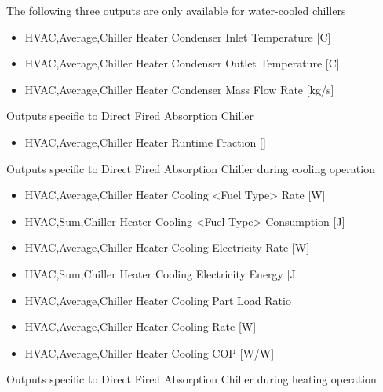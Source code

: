 The following three outputs are only available for water-cooled chillers

\begin{itemize}
\item
  HVAC,Average,Chiller Heater Condenser Inlet Temperature {[}C{]}
\item
  HVAC,Average,Chiller Heater Condenser Outlet Temperature {[}C{]}
\item
  HVAC,Average,Chiller Heater Condenser Mass Flow Rate {[}kg/s{]}
\end{itemize}

Outputs specific to Direct Fired Absorption Chiller

\begin{itemize}
\tightlist
\item
  HVAC,Average,Chiller Heater Runtime Fraction {[]}
\end{itemize}

Outputs specific to Direct Fired Absorption Chiller during cooling operation

\begin{itemize}
\item
  HVAC,Average,Chiller Heater Cooling \textless{}Fuel Type\textgreater{} Rate {[}W{]}
\item
  HVAC,Sum,Chiller Heater Cooling \textless{}Fuel Type\textgreater{} Consumption {[}J{]}
\item
  HVAC,Average,Chiller Heater Cooling Electricity Rate {[}W{]}
\item
  HVAC,Sum,Chiller Heater Cooling Electricity Energy {[}J{]}
\item
  HVAC,Average,Chiller Heater Cooling Part Load Ratio
\item
  HVAC,Average,Chiller Heater Cooling Rate {[}W{]}
\item
  HVAC,Average,Chiller Heater Cooling COP {[}W/W{]}
\end{itemize}

Outputs specific to Direct Fired Absorption Chiller during heating operation

